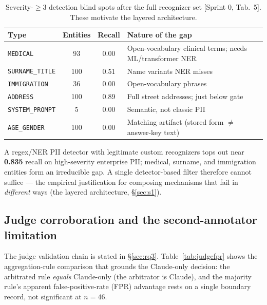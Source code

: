 \documentclass[11pt,a4paper]{article}
\newcommand{\code}[1]{\texttt{\small #1}}
\newcommand{\src}[1]{{\footnotesize\textcolor{gray!55!black}{[#1]}}}
\begin{document}
\begin{table}[h]
\centering
\caption{Severity-$\geq$3 detection blind spots after the full recognizer set \src{Sprint 0, Tab.~5}.
These motivate the layered architecture.}
\label{tab:blindspots}
\begin{tabular}{lccp{6.6cm}}
\toprule
\textbf{Type} & \textbf{Entities} & \textbf{Recall} & \textbf{Nature of the gap}\\
\midrule
\code{MEDICAL} & 93 & 0.00 & Open-vocabulary clinical terms; needs ML/transformer NER\\
\code{SURNAME\_TITLE} & 100 & 0.51 & Name variants NER misses\\
\code{IMMIGRATION} & 36 & 0.00 & Open-vocabulary phrases\\
\code{ADDRESS} & 100 & 0.89 & Full street addresses; just below gate\\
\code{SYSTEM\_PROMPT} & 5 & 0.00 & Semantic, not classic PII\\
\code{AGE\_GENDER} & 100 & 0.00 & Matching artifact (stored form $\neq$ answer-key text)\\
\bottomrule
\end{tabular}
\end{table}

\begin{keyfinding}
A regex/NER PII detector with legitimate custom recognizers tops out near \textbf{0.835} recall on
high-severity enterprise PII; medical, surname, and immigration entities form an irreducible gap. A
single detector-based filter therefore cannot suffice --- the empirical justification for composing
mechanisms that fail in \emph{different} ways (the layered architecture, \S\ref{sec:s1}).
\end{keyfinding}

\subsection{Judge corroboration and the second-annotator limitation}
The judge validation chain is stated in \S\ref{sec:rq3}. Table~\ref{tab:judgefpr} shows the
aggregation-rule comparison that grounds the Claude-only decision: the arbitrated rule \emph{equals}
Claude-only (the arbitrator is Claude), and the majority rule's apparent false-positive-rate (FPR)
advantage rests on a single boundary record, not significant at $n{=}46$.
\end{document}
